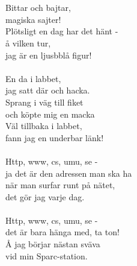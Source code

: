 {\footnotesize{}}\\
\\
Bittar och bajtar,\\
magiska sajter!\\
Plötsligt en dag har det hänt -\\
å vilken tur,\\
jag är en ljusbblå figur!\\
\\
En da i labbet,\\
jag satt där och hacka.\\
Sprang i väg till fiket\\
och köpte mig en macka\\
Väl tillbaka i labbet,\\
fann jag en underbar länk!\\
\\
Http, www, cs, umu, se -\\
ja det är den adressen man ska ha\\
när man surfar runt på nätet,\\
det gör jag varje dag.\\
\\
Http, www, cs, umu, se -\\
det är bara hänga med, ta ton!\\
Å jag börjar nästan sväva\\
vid min Sparc-station.\\
\\
{\footnotesize{}}
